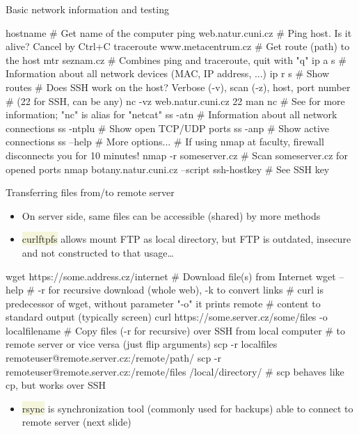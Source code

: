 \documentclass[compress, xelatex, 11pt, xcolor=svgnames, aspectratio=169,
	hyperref={
		bookmarks=true,
		unicode=true,
		colorlinks=true,
		pdftitle={Linux, command line and MetaCentrum},
		plainpages=false,
		pdfauthor={Vojtech Zeisek},
		pdfsubject={Course about use of Linux command line, writing shell scripts and using MetaCentrum of CESNET},
		pdfcreator={XeLaTeX},
		pdfkeywords={Linux, GNU, BASH, shell, command line, MetaCentrum},
		linkcolor=DarkRed, %
		anchorcolor=DarkBlue, %
		citecolor=Indigo, %
		filecolor=NavyBlue, %
		menucolor=DarkMagenta, %
		urlcolor=DarkBlue, %
		},
	url={hyphens, lowtilde} %
	]{beamer}
\renewcommand{\texttt}[1]{\colorbox{Beige}{{\ttfamily #1}}}
\begin{document}
\begin{frame}[fragile]{Basic network information and testing}
	\begin{bashcode}
    hostname # Get name of the computer
    ping web.natur.cuni.cz # Ping host. Is it alive? Cancel by Ctrl+C
    traceroute www.metacentrum.cz # Get route (path) to the host
    mtr seznam.cz # Combines ping and traceroute, quit with "q"
    ip a s # Information about all network devices (MAC, IP address, ...)
    ip r s # Show routes
    # Does SSH work on the host? Verbose (-v), scan (-z), host, port number
    # (22 for SSH, can be any)
    nc -vz web.natur.cuni.cz 22
    man nc # See for more information; "nc" is alias for "netcat"
    ss -atn # Information about all network connections
    ss -ntplu # Show open TCP/UDP ports
    ss -anp # Show active connections
    ss --help # More options...
    # If using nmap at faculty, firewall disconnects you for 10 minutes!
    nmap -r someserver.cz # Scan someserver.cz for opened ports
    nmap botany.natur.cuni.cz --script ssh-hostkey # See SSH key
	\end{bashcode}
\end{frame}

\begin{frame}[fragile]{Transferring files from/to remote server}
	\label{transfers}
	\begin{itemize}
		\item On server side, same files can be accessible (shared) by more methods
		\item \texttt{curlftpfs} allows mount FTP as local directory, but FTP is outdated, insecure and not constructed to that usage\ldots
	\end{itemize}
	\vfill
	\begin{bashcode}
    wget https://some.address.cz/internet # Download file(s) from Internet
    wget --help # -r for recursive download (whole web), -k to convert links
    # curl is predecessor of wget, without parameter "-o" it prints remote
    # content to standard output (typically screen)
    curl https://some.server.cz/some/files -o localfilename
    # Copy files (-r for recursive) over SSH from local computer
    # to remote server or vice versa (just flip arguments)
    scp -r localfiles remoteuser@remote.server.cz:/remote/path/
    scp -r remoteuser@remote.server.cz:/remote/files /local/directory/
    # scp behaves like cp, but works over SSH
	\end{bashcode}
	\vfill
	\begin{itemize}
		\item \texttt{rsync} is synchronization tool (commonly used for backups) able to connect to remote server (next slide)
	\end{itemize}
\end{frame}
\end{document}
